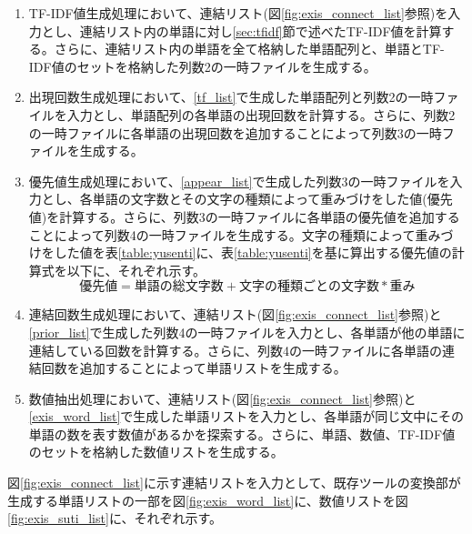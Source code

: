 \begin{enumerate}
    \item TF-IDF値生成処理において、連結リスト(図\ref{fig:exis_connect_list}参照)を入力とし、連結リスト内の単語に対し\ref{sec:tfidf}節で述べたTF-IDF値を計算する。さらに、連結リスト内の単語を全て格納した単語配列と、単語とTF-IDF値のセットを格納した列数2の一時ファイルを生成する。
    \label{tf_list}
    \item 出現回数生成処理において、\ref{tf_list}で生成した単語配列と列数2の一時ファイルを入力とし、単語配列の各単語の出現回数を計算する。さらに、列数2の一時ファイルに各単語の出現回数を追加することによって列数3の一時ファイルを生成する。
    \label{appear_list}
    \item 優先値生成処理において、\ref{appear_list}で生成した列数3の一時ファイルを入力とし、各単語の文字数とその文字の種類によって重みづけをした値(優先値)を計算する。さらに、列数3の一時ファイルに各単語の優先値を追加することによって列数4の一時ファイルを生成する。文字の種類によって重みづけをした値を表\ref{table:yusenti}に、表\ref{table:yusenti}を基に算出する優先値の計算式を以下に、それぞれ示す。
    \begin{equation}\label{eq:yusenti}
        優先値 = 単語の総文字数 + 文字の種類ごとの文字数 * 重み
    \end{equation}
    \label{prior_list}
    \item 連結回数生成処理において、連結リスト(図\ref{fig:exis_connect_list}参照)と\ref{prior_list}で生成した列数4の一時ファイルを入力とし、各単語が他の単語に連結している回数を計算する。さらに、列数4の一時ファイルに各単語の連結回数を追加することによって単語リストを生成する。
    \label{exis_word_list}
    \item 数値抽出処理において、連結リスト(図\ref{fig:exis_connect_list}参照)と\ref{exis_word_list}で生成した単語リストを入力とし、各単語が同じ文中にその単語の数を表す数値があるかを探索する。さらに、単語、数値、TF-IDF値のセットを格納した数値リストを生成する。
\end{enumerate}

図\ref{fig:exis_connect_list}に示す連結リストを入力として、既存ツールの変換部が生成する単語リストの一部を図\ref{fig:exis_word_list}に、数値リストを図\ref{fig:exis_suti_list}に、それぞれ示す。

